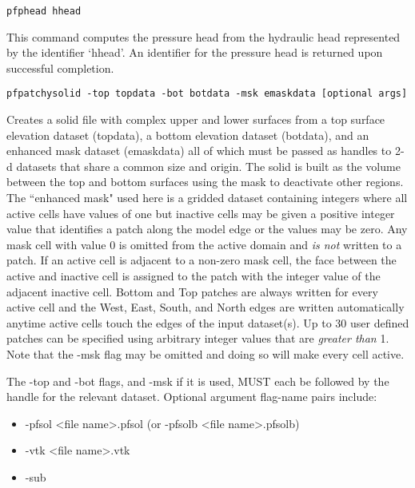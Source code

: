 \begin{description}
\item{\begin{verbatim}pfphead hhead\end{verbatim}}
This command computes the pressure head from the hydraulic head
represented by the identifier `hhead'.  An identifier for the pressure
head is returned upon successful completion.

\item{\begin{verbatim}pfpatchysolid -top topdata -bot botdata -msk emaskdata [optional args] \end{verbatim}}
Creates a solid file with complex upper and lower surfaces from a top surface elevation dataset (topdata), a bottom elevation dataset (botdata), and an enhanced mask dataset (emaskdata) all of which must be passed as handles to 2-d datasets that share a common size and origin. The solid is built as the volume between the top and bottom surfaces using the mask to deactivate other regions. The ``enhanced mask" used here is a gridded dataset containing integers where all
active cells have values of one but inactive cells may be given a positive integer value that identifies
a patch along the model edge or the values may be zero. Any mask cell with value 0 is omitted from the active domain and \textit{is not} written to a patch.
If an active cell is adjacent to a non-zero mask cell, the face between the active and inactive cell is assigned to the
patch with the integer value of the adjacent inactive cell. Bottom and Top patches are always written for every active cell and the West, East, South, and North
edges are written automatically anytime active cells touch the edges of the input dataset(s). Up to 30 user defined patches can be specified using arbitrary integer values that are \textit{greater than} 1.
Note that the -msk flag may be omitted and doing so will make every cell active.

The -top and -bot flags, and -msk if it is used, MUST
each be followed by the handle for the relevant dataset. Optional argument flag-name pairs include:
\begin{itemize}
\item{-pfsol} <file name>.pfsol  (or -pfsolb <file name>.pfsolb)
\item{-vtk} <file name>.vtk
\item{-sub}
\end{itemize}


\end{description}
